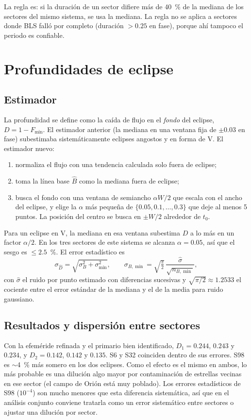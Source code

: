 \documentclass[11pt,a4paper]{article}
\begin{document}
La regla es: si la duración de un sector difiere más de 40~\% de la mediana de los sectores del mismo
sistema, se usa la mediana. La regla no se aplica a sectores donde BLS falló por completo
(duración $>0.25$ en fase), porque ahí tampoco el periodo es confiable.

\section{Profundidades de eclipse}
\label{sec:profundidades}

\subsection{Estimador}
La profundidad se define como la caída de flujo en el \emph{fondo} del eclipse,
$D=1-F_{\min}$. El estimador anterior (la mediana en una ventana fija de $\pm0.03$ en fase)
subestimaba sistemáticamente eclipses angostos y en forma de V. El estimador nuevo:
\begin{enumerate}
\item normaliza el flujo con una tendencia calculada solo fuera de eclipse;
\item toma la línea base $\hat B$ como la mediana fuera de eclipse;
\item busca el fondo con una ventana de semiancho $\alpha W/2$ que escala con el ancho del eclipse,
  y elige la $\alpha$ más pequeña de $\{0.05,0.1,\ldots,0.3\}$ que deje al menos 5 puntos. La posición
  del centro se busca en $\pm W/2$ alrededor de $t_0$.
\end{enumerate}
Para un eclipse en V, la mediana en esa ventana subestima $D$ a lo más en un factor $\alpha/2$. En
los tres sectores de este sistema se alcanza $\alpha=0.05$, así que el sesgo es $\le2.5$~\%. El
error estadístico es
\begin{equation}
\sigma_{\hat D}=\sqrt{\sigma_B^2+\sigma_{\min}^2},\qquad
\sigma_{B,\min}=\sqrt{\tfrac{\pi}{2}}\,\frac{\hat\sigma}{\sqrt{n_{B,\min}}},
\end{equation}
con $\hat\sigma$ el ruido por punto estimado con diferencias sucesivas y $\sqrt{\pi/2}\approx1.2533$
el cociente entre el error estándar de la mediana y el de la media para ruido gaussiano.

\subsection{Resultados y dispersión entre sectores}
Con la efeméride refinada y el primario bien identificado, $D_1=0.244$, $0.243$ y $0.234$, y
$D_2=0.142$, $0.142$ y $0.135$. S6 y S32 coinciden dentro de sus errores. S98 es $\sim$4~\% más
somero en los dos eclipses. Como el efecto es el mismo en ambos, lo más probable es una dilución
algo mayor por contaminación de estrellas vecinas en ese sector (el campo de Orión está muy
poblado). Los errores estadísticos de S98 ($10^{-4}$) son mucho menores que esta diferencia
sistemática, así que en el análisis conjunto conviene tratarla como un error sistemático entre
sectores o ajustar una dilución por sector.
\end{document}
